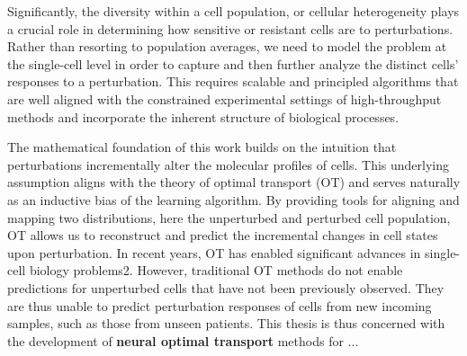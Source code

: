 Significantly, the diversity within a cell population, or cellular heterogeneity plays a crucial role in determining how sensitive or resistant cells are to perturbations.
Rather than resorting to population averages, we need to model the problem at the single-cell level in order to capture and then further analyze the distinct cells' responses to a perturbation. This requires scalable and principled algorithms that are well aligned with the constrained experimental settings of high-throughput methods and incorporate the inherent structure of biological processes.

The mathematical foundation of this work builds on the intuition that perturbations incrementally alter the molecular profiles of cells. This underlying assumption aligns with the theory of optimal transport (OT) and serves naturally as an inductive bias of the learning algorithm. By providing tools for aligning and mapping two distributions, here the unperturbed and perturbed cell population, OT allows us to reconstruct and predict the incremental changes in cell states upon perturbation. 
In recent years, OT has enabled significant advances in single-cell biology problems2. However, traditional OT methods do not enable predictions for unperturbed cells that have not been previously observed.
They are thus unable to predict perturbation responses of cells from new incoming samples, such as those from unseen patients. 
This thesis is thus concerned with the development of \textbf{neural optimal transport} methods for ...

